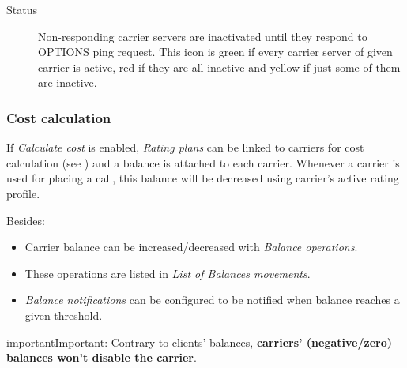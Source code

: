 \documentclass[letterpaper,10pt,english]{sphinxmanual}
\begin{document}
\begin{description}
\item[{Status}] \leavevmode{}\label{administration_portal/brand/providers/carriers:term-status}
Non-responding carrier servers are inactivated until they respond to OPTIONS ping request. This icon is green if
every carrier server of given carrier is active, red if they are all inactive and yellow if just some of them are inactive.

\end{description}


\subsubsection{Cost calculation}
\label{administration_portal/brand/providers/carriers:cost-calculation}
If \emph{Calculate cost} is enabled, \emph{Rating plans} can be linked to carriers for cost calculation (see
{\hyperref[administration_portal/brand/billing/rating_plans:assigning\string-rating\string-plans\string-to\string-carriers]{}}) and a balance is attached to each carrier. Whenever a carrier is used for
placing a call, this balance will be decreased using carrier's active rating profile.

Besides:
\begin{itemize}
\item {} 
Carrier balance can be increased/decreased with \emph{Balance operations}.

\item {} 
These operations are listed in \emph{List of Balances movements}.

\item {} 
\emph{Balance notifications} can be configured to be notified when balance reaches a given threshold.

\end{itemize}

\begin{notice}{important}{Important:}
Contrary to clients' balances, \textbf{carriers' (negative/zero) balances won't disable the carrier}.
\end{notice}
\end{document}

